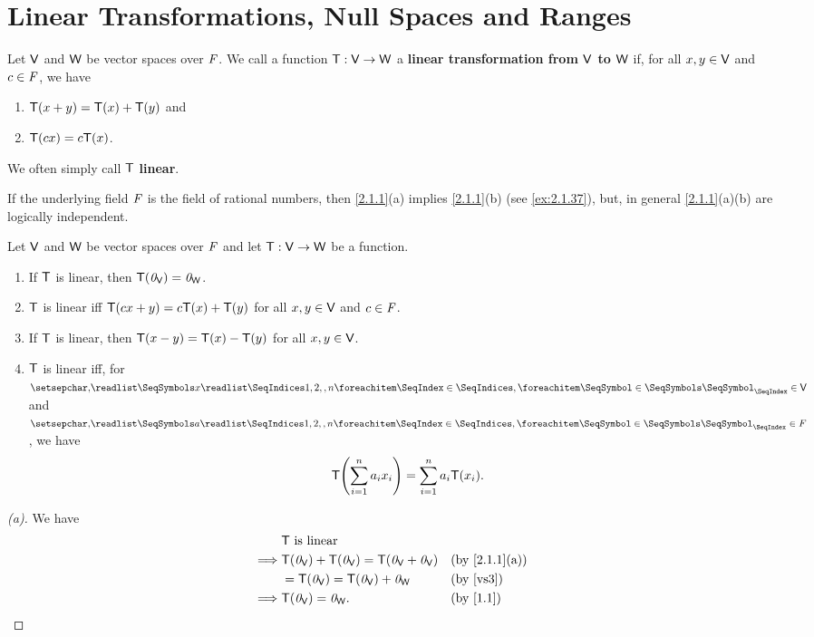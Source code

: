 \section{Linear Transformations, Null Spaces and Ranges}\label{sec:2.1}

\begin{defn}\label{2.1.1}
  Let \(\mathsf{V}\) and \(\mathsf{W}\) be vector spaces over \(\mathit{F}\).
  We call a function \(\mathsf{T} : \mathsf{V} \to \mathsf{W}\) a \textbf{linear transformation from \(\mathsf{V}\) to \(\mathsf{W}\)} if, for all \(x, y \in \mathsf{V}\) and \(c \in \mathit{F}\), we have
  \begin{enumerate}
    \item \(\mathsf{T}(x + y) = \mathsf{T}(x) + \mathsf{T}(y)\) and
    \item \(\mathsf{T}(cx) = c\mathsf{T}(x)\).
  \end{enumerate}
  We often simply call \(\mathsf{T}\) \textbf{linear}.
\end{defn}

\begin{note}
  If the underlying field \(\mathit{F}\) is the field of rational numbers, then \cref{2.1.1}(a) implies \cref{2.1.1}(b) (see \cref{ex:2.1.37}), but, in general \cref{2.1.1}(a)(b) are logically independent.
\end{note}

\begin{prop}\label{2.1.2}
  Let \(\mathsf{V}\) and \(\mathsf{W}\) be vector spaces over \(\mathit{F}\) and let \(\mathsf{T} : \mathsf{V} \to \mathsf{W}\) be a function.
  \begin{enumerate}
    \item If \(\mathsf{T}\) is linear, then \(\mathsf{T}(\mathit{0}_{\mathsf{V}}) = \mathit{0}_{\mathsf{W}}\).
    \item \(\mathsf{T}\) is linear iff \(\mathsf{T}(cx + y) = c\mathsf{T}(x) + \mathsf{T}(y)\) for all \(x, y \in \mathsf{V}\) and \(c \in \mathit{F}\).
    \item If \(\mathsf{T}\) is linear, then \(\mathsf{T}(x - y) = \mathsf{T}(x) - \mathsf{T}(y)\) for all \(x, y \in \mathsf{V}\).
    \item \(\mathsf{T}\) is linear iff, for \(\seq{x}{1,2,,n} \in \V\) and \(\seq{a}{1,2,,n} \in F\), we have
          \[
            \T\pa{\sum_{i = 1}^n a_i x_i} = \sum_{i = 1}^n a_i \T(x_i).
          \]
  \end{enumerate}
\end{prop}

\begin{proof}[(a)]
  We have
  \begin{align*}
             & \T \text{ is linear}                                                                   \\
    \implies & \T(\zv_{\V}) + \T(\zv_{\V}) = \T(\zv_{\V} + \zv_{\V}) &  & \text{(by \cref{2.1.1}(a))} \\
             & = \T(\zv_{\V}) = \T(\zv_{\V}) + \zv_{\W}              &  & \text{(by \ref{vs3})}       \\
    \implies & \T(\zv_{\V}) = \zv_{\W}.                              &  & \text{(by \cref{1.1})}
  \end{align*}
\end{proof}


